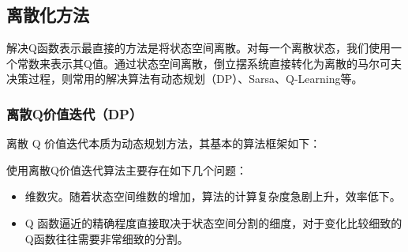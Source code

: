 \documentclass[conference,10pt]{IEEEtran}
\begin{document}
\subsection{离散化方法}
解决Q函数表示最直接的方法是将状态空间离散。对每一个离散状态，我们使用一个常数来表示其Q值。通过状态空间离散，倒立摆系统直接转化为离散的马尔可夫决策过程，则常用的解决算法有动态规划（DP）、Sarsa、Q-Learning等。

\subsubsection{离散Q价值迭代（DP）}

离散 Q 价值迭代本质为动态规划方法，其基本的算法框架如下：
\begin{center}
\end{center}
使用离散Q价值迭代算法主要存在如下几个问题：
\begin{itemize}
	\item 维数灾。随着状态空间维数的增加，算法的计算复杂度急剧上升，效率低下。
	\item Q 函数逼近的精确程度直接取决于状态空间分割的细度，对于变化比较细致的Q函数往往需要非常细致的分割。
\end{itemize}
\end{document}
